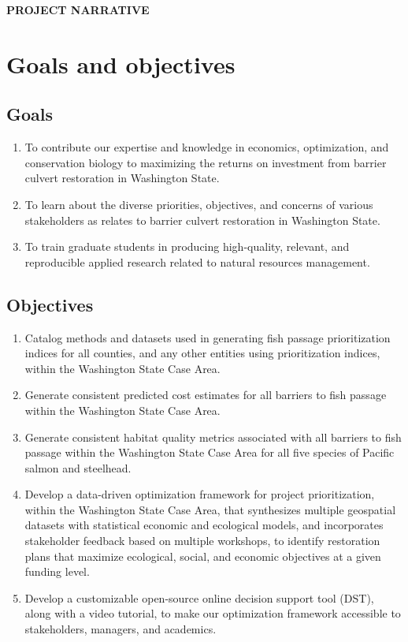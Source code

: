 \documentclass[12pt]{elsarticle}
\begin{document}
\begin{center} \textbf{PROJECT NARRATIVE} \end{center}

%
\section{Goals and objectives} 
\subsection*{Goals}
\begin{enumerate}
\item To contribute our expertise and knowledge in economics, optimization, and conservation biology to maximizing the returns on investment from barrier culvert restoration in Washington State.
\item To learn about the diverse priorities, objectives, and concerns of various stakeholders as relates to barrier culvert restoration in Washington State.
\item To train graduate students in producing high-quality, relevant, and reproducible applied research related to natural resources management.
\end{enumerate}

\subsection*{Objectives}
\begin{enumerate}
\item Catalog methods and datasets used in generating fish passage prioritization indices for all counties, and any other entities using prioritization indices, within the Washington State Case Area. 
\item Generate consistent predicted cost estimates for all barriers to fish passage within the Washington State Case Area. 
\item Generate consistent habitat quality metrics associated with all barriers to fish passage within the Washington State Case Area for all five species of Pacific salmon and steelhead.
\item Develop a data-driven optimization framework for project prioritization, within the Washington State Case Area, that synthesizes multiple geospatial datasets with statistical economic and ecological models, and incorporates stakeholder feedback based on multiple workshops, to identify restoration plans that maximize ecological, social, and economic objectives at a given funding level.
\item Develop a customizable open-source online decision support tool (DST), along with a video tutorial, to make our optimization framework accessible to stakeholders, managers, and academics. 
\end{enumerate}
\end{document}
